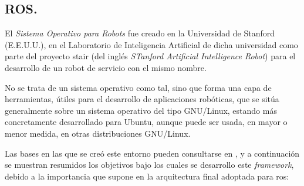\subsection{ROS.}

El \emph{Sistema Operativo para Robots} fue creado en la Universidad de Stanford (E.E.U.U.), en el Laboratorio de Inteligencia Artificial de dicha universidad como parte del proyecto \acrshort{stair} (del inglés \emph{STanford Artificial Intelligence Robot}) para el desarrollo de un robot de servicio con el mismo nombre. \par 

No se trata de un sistema operativo como tal, sino que forma una capa de herramientas, útiles para el desarrollo de aplicaciones robóticas, que se sitúa generalmente sobre un sistema operativo del tipo GNU/Linux, estando más concretamente desarrollado para Ubuntu, aunque puede ser usada, en mayor o menor medida, en otras distribuciones GNU/Linux. \par 

Las bases en las que se creó este entorno pueden consultarse en \cite{quigley2009ros}, y a continuación se muestran resumidos los objetivos bajo los cuales se desarrollo este \emph{framework}, debido a la importancia que supone en la arquitectura final adoptada para \acrshort{ros}:

